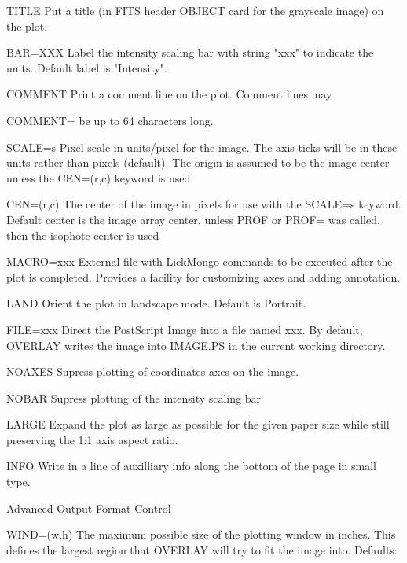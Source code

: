 \begin{command}
  \item[TITLE  ]{Put a title (in FITS header OBJECT card for the grayscale 
                 image) on the plot.}
  \item[BAR=XXX ]{Label the intensity scaling bar with string "xxx" to 
                  indicate the units. Default label is "Intensity".}
  \item[COMMENT ]{Print a comment line on the plot.  Comment lines may}
  \item[COMMENT= ]{be up to 64 characters long. }
  \item[SCALE=s ]{Pixel scale in units/pixel for the image.  The axis ticks 
                  will be in these units rather than pixels (default).  
                  The origin is assumed to be the image center unless the 
                  CEN=(r,c) keyword is used.}
  \item[CEN=(r,c) ]{The center of the image in pixels for use with the SCALE=s 
                  keyword.  Default center is the image array center, unless 
                  PROF or PROF= was called, then the isophote center is used }
  \item[MACRO=xxx]{External file with LickMongo commands to be executed 
                  after the plot is completed.  Provides a facility for 
                  customizing axes and adding annotation.}
  \item[LAND ]{Orient the plot in landscape mode.  Default is Portrait.}
  \item[FILE=xxx]{Direct the PostScript Image into a file named xxx.  By 
                  default, OVERLAY writes the image into IMAGE.PS in the 
                  current working directory.}
  \item[NOAXES ]{Supress plotting of coordinates axes on the image.}
  \item[NOBAR ]{Supress plotting of the intensity scaling bar}
  \item[LARGE]{Expand the plot as large as possible for the given paper size
               while still preserving the 1:1 axis aspect ratio.}
  \item[INFO]{Write in a line of auxilliary info along the bottom of 
              the page in small type.}
  \item[Advanced Output Format Control\hfill]{}
  \item[WIND=(w,h)]{The maximum possible size of the plotting window in inches.
                  This defines the largest region that OVERLAY will try to 
                  fit the image into.  Defaults:\newline
}
\end{command}

